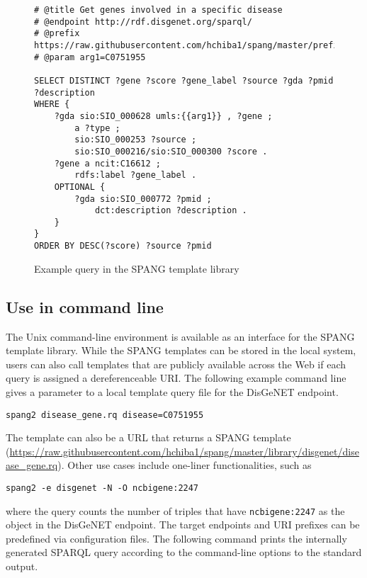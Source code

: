 \documentclass[runningheads]{llncs}
\begin{document}
\begin{figure}[!t]
\begin{scriptsize}
\begin{verbatim}
# @title Get genes involved in a specific disease
# @endpoint http://rdf.disgenet.org/sparql/
# @prefix https://raw.githubusercontent.com/hchiba1/spang/master/prefix/bio
# @param arg1=C0751955 

SELECT DISTINCT ?gene ?score ?gene_label ?source ?gda ?pmid ?description
WHERE {
    ?gda sio:SIO_000628 umls:{{arg1}} , ?gene ;
        a ?type ;
        sio:SIO_000253 ?source ;
        sio:SIO_000216/sio:SIO_000300 ?score .
    ?gene a ncit:C16612 ;
        rdfs:label ?gene_label .
    OPTIONAL {
        ?gda sio:SIO_000772 ?pmid ;
            dct:description ?description .
    }
}
ORDER BY DESC(?score) ?source ?pmid

\end{verbatim}
\end{scriptsize}
\caption{Example query in the SPANG template library}
\label{fig:example-sparql}
\end{figure}


\subsection{Use in command line}

The Unix command-line environment is available as an interface for the SPANG template library.
While the SPANG templates can be stored in the local system, users can also call templates that are publicly available across the Web if each query is assigned a dereferenceable URI.
The following example command line gives a parameter to a local template query file for the DisGeNET endpoint.

\texttt{spang2 disease\_gene.rq disease=C0751955}

\noindent The template can also be a URL that returns a SPANG template (\url{https://raw.githubusercontent.com/hchiba1/spang/master/library/disgenet/disease_gene.rq}). Other use cases include one-liner functionalities, such as

\texttt{spang2 -e disgenet -N -O ncbigene:2247}

\noindent where the query counts the number of triples that have \texttt{ncbigene:2247} as the object in the DisGeNET endpoint. The target endpoints and URI prefixes can be predefined via configuration files. The following command prints the internally generated SPARQL query according to the command-line options to the standard output. 
\end{document}
